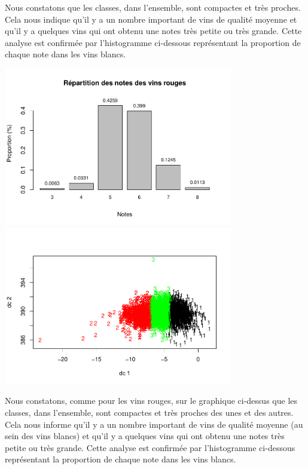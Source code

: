 \documentclass[
]{article}
\begin{document}
Nous constatons que les classes, dans l'ensemble, sont compactes et très
proches. Cela nous indique qu'il y a un nombre important de vins de
qualité moyenne et qu'il y a quelques vins qui ont obtenu une notes très
petite ou très grande. Cette analyse est confirmée par l'histogramme
ci-dessous représentant la proportion de chaque note dans les vins
blancs.

\begin{center}
	\includegraphics[width=10cm]{repport_files/figure-latex/unnamed-chunk-9-1.pdf}
	\includegraphics[width=10cm]{repport_files/figure-latex/unnamed-chunk-10-1.pdf} 
\end{center}

Nous constatons, comme pour les vins rouges, sur le graphique ci-dessus que
les classes, dans l'ensemble, sont compactes et très proches des unes et
des autres. Cela nous informe qu'il y a un nombre important de vins de
qualité moyenne (au sein des vins blancs) et qu'il y a quelques vins qui
ont obtenu une notes très petite ou très grande. Cette analyse est
confirmée par l'histogramme ci-dessous représentant la proportion de
chaque note dans les vins blancs.
\end{document}
